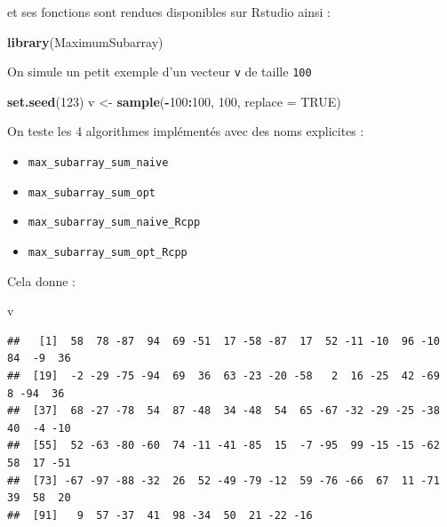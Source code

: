 \documentclass[
]{article}
\newenvironment{Shaded}{\begin{snugshade}}{\end{snugshade}}
\newcommand{\AttributeTok}[1]{\textcolor[rgb]{0.13,0.29,0.53}{#1}}
\newcommand{\ConstantTok}[1]{\textcolor[rgb]{0.56,0.35,0.01}{#1}}
\newcommand{\DecValTok}[1]{\textcolor[rgb]{0.00,0.00,0.81}{#1}}
\newcommand{\FunctionTok}[1]{\textcolor[rgb]{0.13,0.29,0.53}{\textbf{#1}}}
\newcommand{\NormalTok}[1]{#1}
\newcommand{\OtherTok}[1]{\textcolor[rgb]{0.56,0.35,0.01}{#1}}
\newcommand{\SpecialCharTok}[1]{\textcolor[rgb]{0.81,0.36,0.00}{\textbf{#1}}}
\providecommand{\tightlist}{%
  \setlength{\itemsep}{0pt}\setlength{\parskip}{0pt}}
\begin{document}
et ses fonctions sont rendues disponibles sur Rstudio ainsi :

\begin{Shaded}
\begin{Highlighting}[]
\FunctionTok{library}\NormalTok{(MaximumSubarray)}
\end{Highlighting}
\end{Shaded}

On simule un petit exemple d'un vecteur \texttt{v} de taille
\texttt{100}

\begin{Shaded}
\begin{Highlighting}[]
\FunctionTok{set.seed}\NormalTok{(}\DecValTok{123}\NormalTok{)}
\NormalTok{v }\OtherTok{\textless{}{-}} \FunctionTok{sample}\NormalTok{(}\SpecialCharTok{{-}}\DecValTok{100}\SpecialCharTok{:}\DecValTok{100}\NormalTok{, }\DecValTok{100}\NormalTok{, }\AttributeTok{replace =} \ConstantTok{TRUE}\NormalTok{)}
\end{Highlighting}
\end{Shaded}

On teste les 4 algorithmes implémentés avec des noms explicites :

\begin{itemize}
\tightlist
\item
  \texttt{max\_subarray\_sum\_naive}
\item
  \texttt{max\_subarray\_sum\_opt}
\item
  \texttt{max\_subarray\_sum\_naive\_Rcpp}
\item
  \texttt{max\_subarray\_sum\_opt\_Rcpp}
\end{itemize}

Cela donne :

\begin{Shaded}
\begin{Highlighting}[]
\NormalTok{v}
\end{Highlighting}
\end{Shaded}

\begin{verbatim}
##   [1]  58  78 -87  94  69 -51  17 -58 -87  17  52 -11 -10  96 -10  84  -9  36
##  [19]  -2 -29 -75 -94  69  36  63 -23 -20 -58   2  16 -25  42 -69   8 -94  36
##  [37]  68 -27 -78  54  87 -48  34 -48  54  65 -67 -32 -29 -25 -38  40  -4 -10
##  [55]  52 -63 -80 -60  74 -11 -41 -85  15  -7 -95  99 -15 -15 -62  58  17 -51
##  [73] -67 -97 -88 -32  26  52 -49 -79 -12  59 -76 -66  67  11 -71  39  58  20
##  [91]   9  57 -37  41  98 -34  50  21 -22 -16
\end{verbatim}
\end{document}
